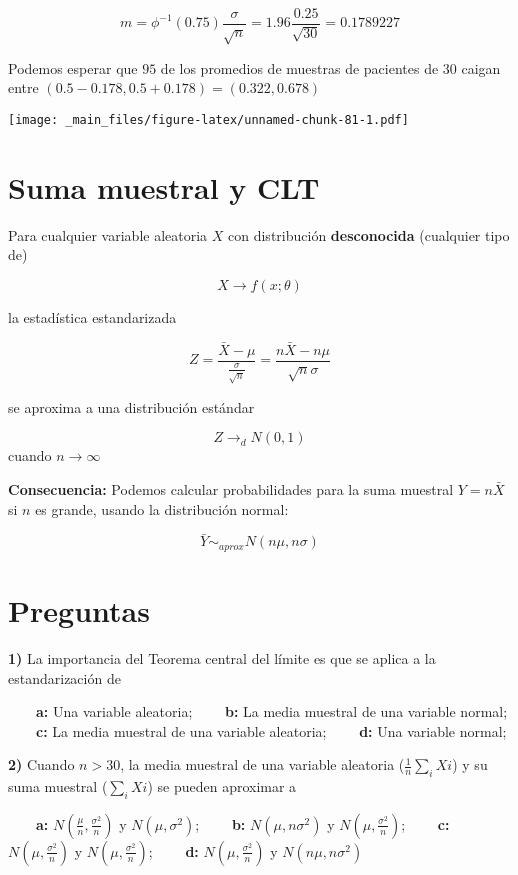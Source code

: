 \documentclass[
]{book}
\begin{document}
\[m=\phi^{-1}(0.75) \frac{\sigma}{\sqrt{n}}=1.96\frac{0.25}{\sqrt{30}}=0.1789227\]

Podemos esperar que \(95%
\) de los promedios de muestras de pacientes de \(30\) caigan entre
\((0.5-0.178, 0.5+0.178)= (0.322, 0.678)\)

\texttt{[image: \_main\_files/figure-latex/unnamed-chunk-81-1.pdf]}

\hypertarget{suma-muestral-y-clt}{%
\section{Suma muestral y CLT}\label{suma-muestral-y-clt}}

Para cualquier variable aleatoria \(X\) con distribución \textbf{desconocida} (cualquier tipo de)

\[X \rightarrow f(x; \theta)\]

la estadística estandarizada

\[Z=\frac{\bar{X}-\mu}{\frac{\sigma}{\sqrt{n}}}=\frac{n\bar{X}-n\mu}{\sqrt{n}\sigma}\]

se aproxima a una distribución estándar

\[Z \rightarrow_d N(0,1)\] cuando \(n\rightarrow \infty\)

\textbf{Consecuencia:} Podemos calcular probabilidades para la suma muestral \(Y=n\bar{X}\) si \(n\) es grande, usando la distribución normal:

\[\bar{Y} \sim_{aprox} N(n\mu, n\sigma)\]

\hypertarget{preguntas-8}{%
\section{Preguntas}\label{preguntas-8}}

\textbf{1)} La importancia del Teorema central del límite es que se aplica a la estandarización de

\textbf{\(\qquad\)a:} Una variable aleatoria;
\textbf{\(\qquad\)b:} La media muestral de una variable normal;
\textbf{\(\qquad\)c:} La media muestral de una variable aleatoria;
\textbf{\(\qquad\)d:} Una variable normal;

\textbf{2)} Cuando \(n>30\), la media muestral de una variable aleatoria (\(\frac{1}{n}\sum_i Xi\)) y su suma muestral (\(\sum_i Xi\)) se pueden aproximar a

\textbf{\(\qquad\)a:} \(N(\frac{\mu}{n}, \frac{\sigma^2}{n})\) y \(N(\mu, \sigma^2)\);
\textbf{\(\qquad\)b:} \(N(\mu, n\sigma^2)\) y \(N(\mu, \frac{\sigma^2}{n})\);
\textbf{\(\qquad\)c:} \(N(\mu, \frac{\sigma^2}{n})\) y \(N(\mu, \frac{\sigma^2}{n})\);
\textbf{\(\qquad\)d:} \(N(\mu, \frac{\sigma^2}{n})\) y \(N(n\mu, n\sigma^2)\)
\end{document}
